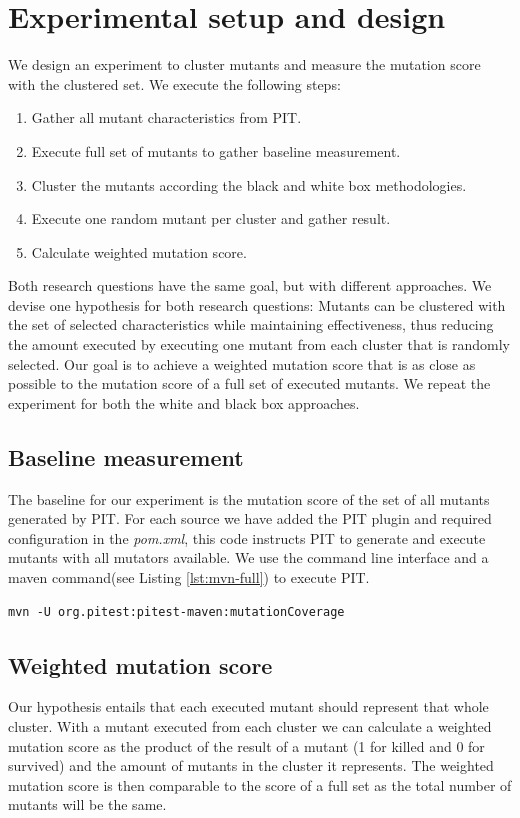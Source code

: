 \documentclass[conference,draftclsnofoot,onecolumn]{IEEEtran}
\begin{document}
\section{Experimental setup and design}
We design an experiment to cluster mutants and measure the mutation score with the clustered set. 
We execute the following steps:
\begin{enumerate}
    \item Gather all mutant characteristics from PIT.
    \item Execute full set of mutants to gather baseline measurement.
    \item Cluster the mutants according the black and white box methodologies.
    \item Execute one random mutant per cluster and gather result.
    \item Calculate weighted mutation score.
\end{enumerate}
Both research questions have the same goal, but with different approaches. We devise one hypothesis for both research questions: Mutants can be clustered with the set of selected characteristics while maintaining effectiveness, thus reducing the amount executed by executing one mutant from each cluster that is randomly selected.
Our goal is to achieve a weighted mutation score that is as close as possible to the mutation score of a full set of executed mutants.
We repeat the experiment for both the white and black box approaches.

\subsection{Baseline measurement}
The baseline for our experiment is the mutation score of the set of all mutants generated by PIT.
For each source we have added the PIT plugin and required configuration in the \textit{pom.xml}, this code instructs PIT to generate and execute mutants with all mutators available.
We use the command line interface and a maven command(see Listing \ref{lst:mvn-full}) to execute PIT.
\begin{lstlisting}[label=lst:mvn-full,caption=Command to execute full set of mutants with PIT.]
mvn -U org.pitest:pitest-maven:mutationCoverage
\end{lstlisting}

\subsection{Weighted mutation score}
\label{ch:weighted_score}
Our hypothesis entails that each executed mutant should represent that whole cluster. With a mutant executed from each cluster we can calculate a weighted mutation score as the product of the result of a mutant (1 for killed and 0 for survived) and the amount of mutants in the cluster it represents. The weighted mutation score is then comparable to the score of a full set as the total number of mutants will be the same.
\end{document}
